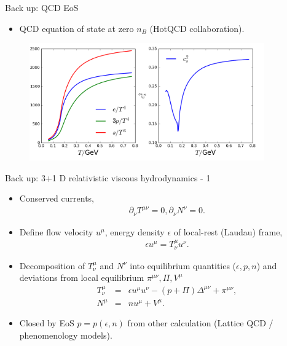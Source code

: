 \documentclass[11pt]{beamer}
\begin{document}
\begin{frame}[noframenumbering]{Back up: QCD EoS}
\begin{itemize}
\item QCD equation of state at zero $n_B$ (HotQCD collaboration).
\end{itemize}
\begin{center}
\begin{figure}
\includegraphics[width = 0.9\textwidth]{./pics/EoS.png}
\end{figure}
\end{center}
\end{frame}

\begin{frame}[noframenumbering]{Back up: 3+1 D relativistic viscous hydrodynamics - 1}
\begin{itemize}
\item Conserved currents,
\begin{eqnarray}
\nonumber
\partial_\nu T^{\mu\nu} = 0, \partial_\nu N^{\nu} = 0.
\end{eqnarray}
\item Define flow velocity $u^\mu$, energy density $\epsilon$ of local-rest (Laudau) frame,
\begin{eqnarray}
\nonumber
\epsilon u^\mu = T^{\mu}_{\nu} u^\nu.
\end{eqnarray}
\item Decomposition of $T^{\mu}_{\nu}$ and $N^{\nu}$ into equilibrium quantities ($\epsilon, p, n$) and deviations from local equilibrium $\pi^{\mu\nu}, \Pi, V^\mu$
\begin{eqnarray}
\nonumber
T^{\mu}_{\nu} &=& \epsilon u^{\mu}u^\nu - (p+\Pi)\Delta^{\mu\nu} + \pi^{\mu\nu}, \\
\nonumber
N^{\mu} &=& nu^\mu + V^{\mu}.
\end{eqnarray}
\item Closed by EoS $p = p(\epsilon, n)$ from other calculation (Lattice QCD /  phenomenology models).
\end{itemize}
\end{frame}
\end{document}
